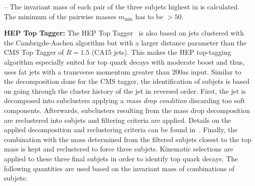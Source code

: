 \begin{description}
\begin{description}
 \item -- The invariant mass of each pair of the three subjets highest in \pt is calculated. The minimum of the pairwise masses $m_{\mathrm{min}}$ has to be $ > 50$\gev.
\end{description}
 \item \textbf{HEP Top Tagger:} The HEP Top Tagger~\cite{Plehn:2010st} is also based on jets clustered with the Cambrigde-Aachen algorithm but with a larger distance parameter than the CMS Top Tagger of $R = 1.5$ (CA15 jets). This makes the HEP top-tagging algorithm especially suited for top quark decays with moderate boost and thus, uses fat jets with a transverse momentum greater than 200\gev as input. %
Similar to the decomposition done for the CMS tagger, the identification of subjets is based on going through the cluster history of the jet in reversed order. First, the jet is decomposed into subclusters applying a \textit{mass drop condition} discarding too soft components. Afterwards, subclusters resulting from the mass drop decomposition are reclustered into subjets and filtering criteria are applied. Details on the applied decomposition and reclustering criteria can be found in~\cite{CMS-PAS-JME-13-007}. Finally, the combination with the mass determined from the filtered subjets closest to the top mass is kept and reclustered to force three subjets. Kinematic selections are applied to these three final subjets in order to identify top quark decays. The following quantities are used based on the invariant mass of combinations of subjets:

\end{description}
